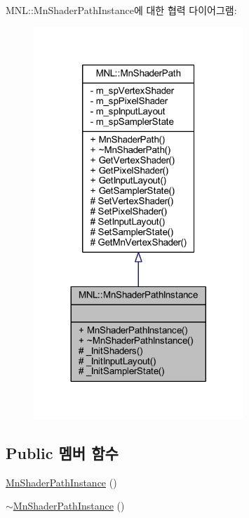 M\+NL\+:\+:Mn\+Shader\+Path\+Instance에 대한 협력 다이어그램\+:\nopagebreak
\begin{figure}[H]
\begin{center}
\leavevmode
\includegraphics[width=224pt]{class_m_n_l_1_1_mn_shader_path_instance__coll__graph}
\end{center}
\end{figure}
\subsection*{Public 멤버 함수}
\begin{DoxyCompactItemize}
\item 
\hyperlink{class_m_n_l_1_1_mn_shader_path_instance_a9dbd10bb88382ec183a3ce9711bd80c0}{Mn\+Shader\+Path\+Instance} ()
\item 
\hyperlink{class_m_n_l_1_1_mn_shader_path_instance_a2cc712de5243295538fd41fe1a5f0e77}{$\sim$\+Mn\+Shader\+Path\+Instance} ()
\end{DoxyCompactItemize}
